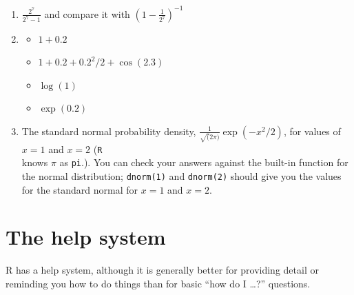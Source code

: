 \documentclass[11pt,]{article}
\providecommand{\tightlist}{%
  \setlength{\itemsep}{0pt}\setlength{\parskip}{0pt}}
\begin{document}
\begin{enumerate}
\def\labelenumi{\arabic{enumi}.}
\item
  \(\frac{2^7}{2^7 - 1}\) and compare it with \(({1 - \frac{1}{2^7}})^{-1}\)
\item
  \begin{itemize}
  \tightlist
  \item
    \(1+0.2\)
  \item
    \(1+0.2+0.2^2/2 + \cos(2.3)\)
  \item
    \(\log(1)\)
  \item
    \(\exp(0.2)\)
  \end{itemize}
\item
  The standard normal probability density, \(\frac{1}{\sqrt(2\pi)}\exp(-x^2/2)\), for values of \(x=1\) and \(x=2\) (\texttt{R}\\
  knows \(\pi\) as \texttt{pi}.). You can check your answers against the built-in function for the normal distribution; \texttt{dnorm(1)} and \texttt{dnorm(2)} should give you the values for the standard normal for \(x=1\) and \(x=2\).
\end{enumerate}

\hypertarget{the-help-system}{%
\section{The help system}\label{the-help-system}}

R has a help system, although it is generally better for providing detail or reminding you how to do things than for basic ``how do I \ldots{}?'' questions.
\end{document}
